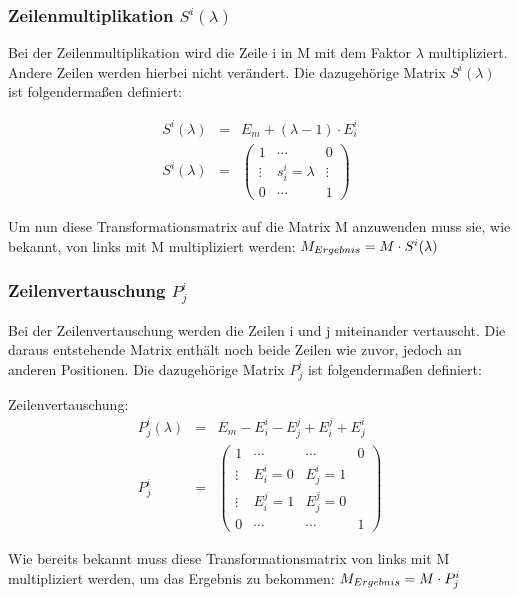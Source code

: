 \subsubsection{Zeilenmultiplikation $S^i(\lambda)$}
Bei der Zeilenmultiplikation wird die Zeile i in M mit dem Faktor $\lambda$ multipliziert. Andere Zeilen werden hierbei nicht verändert. Die dazugehörige Matrix $S^i(\lambda)$ ist folgendermaßen definiert:
\begin{Def}
\begin{eqnarray}
	S^i(\lambda) &=& E_m + (\lambda - 1) \cdot E^i_i \\
	S^i(\lambda) &=& 
	\begin{pmatrix}
	1 & \cdots & 0 \\ 
	\vdots & s^i_i = \lambda & \vdots \\ 
	0 & \cdots & 1
	\end{pmatrix} 
\end{eqnarray}
\end{Def}
\raggedright Um nun diese Transformationsmatrix auf die Matrix M anzuwenden muss sie, wie bekannt, von links mit M multipliziert werden: $M_{\small Ergebnis} = M \cdot S^i(\lambda)$

\subsubsection{Zeilenvertauschung $P^i_j$}
Bei der Zeilenvertauschung werden die Zeilen i und j miteinander vertauscht. Die daraus entstehende Matrix enthält noch beide Zeilen wie zuvor, jedoch an anderen Positionen. Die dazugehörige Matrix $P^i_j$ ist folgendermaßen definiert:
\begin{Def} Zeilenvertauschung:
\begin{eqnarray}
	P_j^i(\lambda) &=& E_m - E^i_i - E^j_j + E^j_i + E^i_j \\
	P^i_j &=& 
	\begin{pmatrix}
	1 & \cdots & \cdots & 0 \\ 
	\vdots & E^i_i = 0 & E^i_j = 1 &  \\ 
	\vdots & E^j_i = 1 & E^j_j = 0 &  \\ 
	0 & \cdots & \cdots & 1
	\end{pmatrix} 
\end{eqnarray}
\end{Def}
\raggedright Wie bereits bekannt muss diese Transformationsmatrix von links mit M multipliziert werden, um das Ergebnis zu bekommen: $M_{\small Ergebnis} = M \cdot P^i_j$